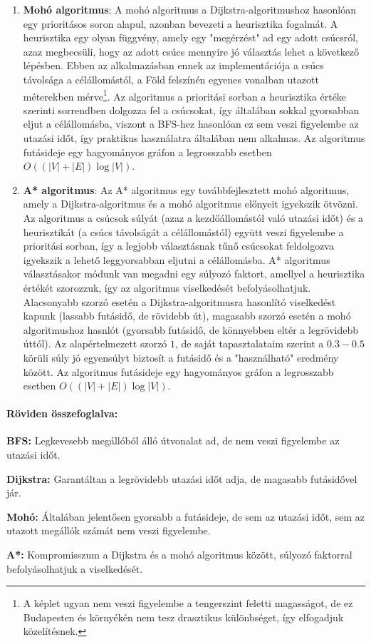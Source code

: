 \begin{enumerate}
	\item \textbf{Mohó algoritmus}: A mohó algoritmus a Dijkstra-algoritmushoz hasonlóan egy prioritásos soron alapul, azonban bevezeti a heurisztika fogalmát. A heurisztika egy olyan függvény, amely egy "megérzést" ad egy adott csúcsról, azaz megbecsüli, hogy az adott csúcs mennyire jó választás lehet a következő lépésben. Ebben az alkalmazásban ennek az implementációja a csúcs távolsága a célállomástól, a Föld felszínén egyenes vonalban utazott méterekben mérve\footnote{A képlet ugyan nem veszi figyelembe a tengerszint feletti magasságot, de ez Budapesten és környékén nem tesz drasztikus különbséget, így elfogadjuk közelítésnek.}. Az algoritmus a prioritási sorban a heurisztika értéke szerinti sorrendben dolgozza fel a csúcsokat, így általában sokkal gyorsabban eljut a célállomásba, viszont a BFS-hez hasonlóan ez sem veszi figyelembe az utazási időt, így praktikus használatra általában nem alkalmas. Az algoritmus futásideje egy hagyományos gráfon a legrosszabb esetben $O((|V| + |E|) \log |V|)$.
	\item \textbf{A* algoritmus}: Az A* algoritmus egy továbbfejlesztett mohó algoritmus, amely a Dijkstra-algoritmus és a mohó algoritmus előnyeit igyekszik ötvözni. Az algoritmus a csúcsok súlyát (azaz a kezdőállomástól való utazási időt) és a heurisztikát (a csúcs távolságát a célállomástól) együtt veszi figyelembe a prioritási sorban, így a legjobb választásnak tűnő csúcsokat feldolgozva igyekszik a lehető leggyorsabban eljutni a célállomásba. A* algoritmus választásakor módunk van megadni egy súlyozó faktort, amellyel a heurisztika értékét szorozzuk, így az algoritmus viselkedését befolyásolhatjuk. Alacsonyabb szorzó esetén a Dijkstra-algoritmusra hasonlító viselkedést kapunk (lassabb futásidő, de rövidebb út), magasabb szorzó esetén a mohó algoritmushoz hasnlót (gyorsabb futásidő, de könnyebben eltér a legrövidebb úttól). Az alapértelmezett szorzó $1$, de saját tapasztalataim szerint a $0.3-0.5$ körüli súly jó egyensúlyt biztosít a futásidő és a "használható" eredmény között. Az algoritmus futásideje egy hagyományos gráfon a legrosszabb esetben $O((|V| + |E|) \log |V|)$.
\end{enumerate}

\paragraph{Röviden összefoglalva:}

\begin{compactitem}
	\item \textbf{BFS:} Legkevesebb megállóból álló útvonalat ad, de nem veszi figyelembe az utazási időt.
	\item \textbf{Dijkstra:} Garantáltan a legrövidebb utazási időt adja, de magasabb futásidővel jár.
	\item \textbf{Mohó:} Általában jelentősen gyorsabb a futásideje, de sem az utazási időt, sem az utazott megállók számát nem veszi figyelembe.
	\item \textbf{A*:} Kompromisszum a Dijkstra és a mohó algoritmus között, súlyozó faktorral befolyásolhatjuk a viselkedését.
\end{compactitem}

